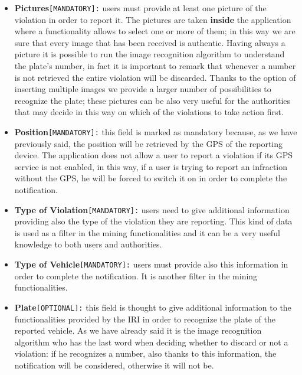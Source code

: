 		\begin{itemize}
			\item \textbf{Pictures}\texttt{[MANDATORY]:} users must provide at least one picture of the violation in order to report it. The pictures are taken \textbf{inside} the application where a functionality allows to select one or more of them; in this way we are sure that every image that has been received is authentic. Having always a picture it is possible to run the image recognition algorithm to understand the plate's number, in fact it is important to remark that whenever a number is not retrieved the entire violation will be discarded. Thanks to the option of inserting multiple images we provide a larger number of possibilities to recognize the plate; these pictures can be also very useful for the authorities that may decide in this way on which of the violations to take action first.
			
			\item \textbf{Position}\texttt{[MANDATORY]:} this field is marked as mandatory because, as we have previously said, the position will be retrieved by the GPS of the reporting device. The application does not allow a user to report a violation if its GPS service is not enabled, in this way, if a user is trying to report an infraction without the GPS, he will be forced to switch it on in order to complete the notification.
			
			\item \textbf{Type of Violation}\texttt{[MANDATORY]:} users need to give additional information providing also the type of the violation they are reporting. This kind of data is used as a filter in the mining functionalities and it can be a very useful knowledge to both users and authorities.
			
			\item \textbf{Type of Vehicle}\texttt{[MANDATORY]:} users must provide also this information in order to complete the notification. It is another filter in the mining functionalities.
			
			\item \textbf{Plate}\texttt{[OPTIONAL]:} this field is thought to give additional information to the functionalities provided by the IRI in order to recognize the plate of the reported vehicle. As we have already said it is the image recognition algorithm who has the last word when deciding whether to discard or not a violation: if he recognizes a number, also thanks to this information, the notification will be considered, otherwise it will not be.
		\end{itemize}
	
